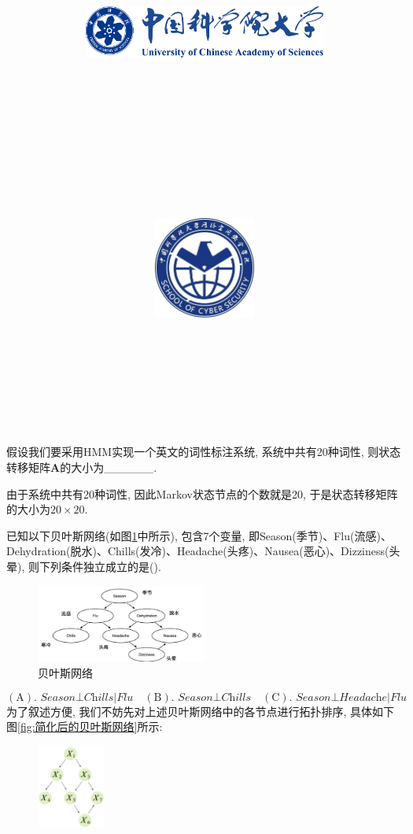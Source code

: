 \documentclass{article}
\title{
	\includegraphics[width=0.6\textwidth]{images/title/ucas_logo 1.pdf}\\
    \vspace{1in}
    \textmd{\textbf{\hmwkClass}}\\
	\textmd{\Large{\textbf{\hmwkClassID}}}\\
    \textmd{\textbf{\hmwkTitle}}\\
    \normalsize\vspace{0.1in}\large{\hmwkCompleteTime }\\
    \vspace{0.1in}\large{\textit{\hmwkClassInstructor\ }}\\
    \vspace{1in}
	\includegraphics[width=0.25\textwidth]{images/title/Cyber.jpg}\\
	\vspace{1in}
}
\author{
	\hmwkAuthorName \\ 
	\hmwkAuthorStuID \\
	\hmwkAuthorInst \\
	\hmwkAuthorzhuanye \\
	\hmwkAuthorfangxiang
	}
\date{}
\begin{document}
\maketitle


%
%
%
%
%

\begin{homeworkProblem}
	假设我们要采用HMM实现一个英文的词性标注系统, 系统中共有20种词性, 则状态转移矩阵$\boldsymbol{A}$的大小为______.

	\solution 由于系统中共有20种词性, 因此Markov状态节点的个数就是20, 于是状态转移矩阵的大小为$20\times 20$.
\end{homeworkProblem}

\begin{homeworkProblem}
	已知以下贝叶斯网络(如图\ref{fig:贝叶斯网络}中所示), 包含7个变量, 即Season(季节)、Flu(流感)、Dehydration(脱水)、Chills(发冷)、Headache(头疼)、Nausea(恶心)、Dizziness(头晕), 则下列条件独立成立的是(\quad).
	\vspace{-2cm}
	\begin{figure}[H]  %
		\centering
		\includegraphics[width=0.5\textwidth]{images/title/贝叶斯网络.jpg}
		\caption{贝叶斯网络}
		\label{fig:贝叶斯网络}
	\end{figure}
	\vspace{-1cm}
	$$
	\left( \text{A} \right) .\,\, \textit{Season}\bot \textit{Chills}|\textit{Flu}\quad \left( \text{B} \right) .\,\, \textit{Season}\bot \textit{Chills}\quad \left( \text{C} \right) .\,\, \textit{Season}\bot \textit{Headache}|\textit{Flu}
	$$
	\solution 为了叙述方便, 我们不妨先对上述贝叶斯网络中的各节点进行拓扑排序, 具体如下图\ref{fig:简化后的贝叶斯网络}所示:
	\begin{figure}[H]  %
		\centering
		\includegraphics[width=0.2\textwidth]{images/title/简化后的贝叶斯网络.pdf}

\end{figure}
\end{homeworkProblem}
\end{document}
